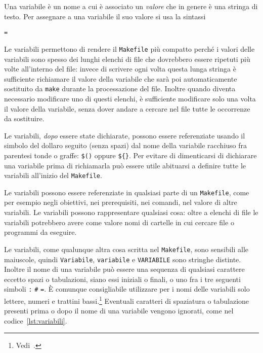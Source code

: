 Una variabile è un nome a cui è associato un \emph{valore} che in genere è una
stringa di testo.  Per assegnare a una variabile il suo valore si usa la
sintassi
\begin{sintassi}
  \small {} \texttt{=} 
\end{sintassi}
Le variabili permettono di rendere il \texttt{Makefile} più compatto perché i
valori delle variabili sono spesso dei lunghi elenchi di file che dovrebbero
essere ripetuti più volte all'interno del file: invece di scrivere ogni volta
questa lunga stringa è sufficiente richiamare il valore della variabile che sarà
poi automaticamente sostituito da \texttt{make} durante la processazione del
file.  Inoltre quando diventa necessario modificare uno di questi elenchi, è
sufficiente modificare solo una volta il valore della variabile, senza dover
andare a cercare nel file tutte le occorrenze da sostituire.

Le variabili, \emph{dopo} essere state dichiarate, possono essere referenziate
usando il simbolo del dollaro seguito (senza spazi) dal nome della variabile
racchiuso fra parentesi tonde o graffe:
\texttt{\$(}\texttt{)} oppure
\texttt{\$\{}\texttt{\}}.  Per evitare di
dimenticarsi di dichiarare una variabile prima di richiamarla può essere utile
abituarsi a definire tutte le variabili all'inizio del \texttt{Makefile}.

Le variabili possono essere referenziate in qualsiasi parte di un
\texttt{Makefile}, come per esempio negli obiettivi, nei prerequisiti, nei
comandi, nel valore di altre variabili.  Le variabili possono rappresentare
qualsiasi cosa: oltre a elenchi di file le variabili potrebbero avere come
valore nomi di cartelle in cui cercare file o programmi da eseguire.

Le variabili, come qualunque altra cosa scritta nel \texttt{Makefile}, sono
sensibili alle maiuscole, quindi \texttt{Variabile}, \texttt{variabile} e
\texttt{VARIABILE} sono stringhe distinte.  Inoltre il nome di una variabile può
essere una sequenza di qualsiasi carattere eccetto spazi o tabulazioni, siano
essi iniziali o finali, o uno fra i tre seguenti simboli \texttt{:} \texttt{\#}
\texttt{=}.  È comunque consigliabile utilizzare per i nomi delle variabili solo
lettere, numeri e trattini bassi.\footnote{Vedi~\cite[pagina 57]{gnu:make}.}
Eventuali caratteri di spaziatura o tabulazione presenti prima o dopo il nome di
una variabile vengono ignorati, come nel codice~\ref{lst:variabili}.

